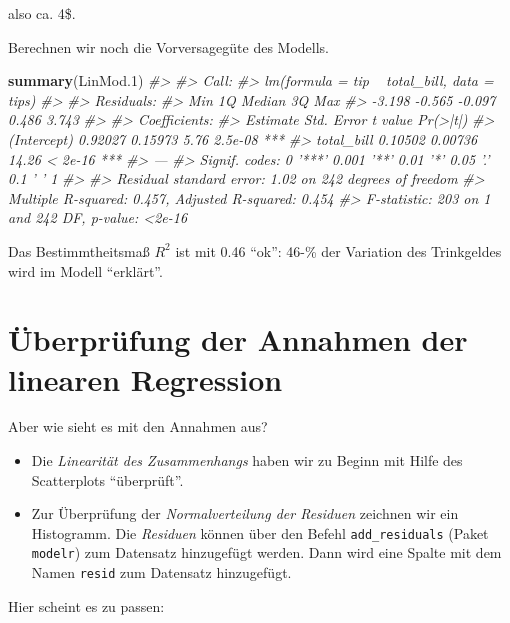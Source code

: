 \documentclass[12pt,ngerman,]{book}
\makeatletter
\newenvironment{Shaded}{\begin{snugshade}}{\end{snugshade}}
\newcommand{\KeywordTok}[1]{\textcolor[rgb]{0.13,0.29,0.53}{\textbf{{#1}}}}
\newcommand{\FloatTok}[1]{\textcolor[rgb]{0.00,0.00,0.81}{{#1}}}
\newcommand{\CommentTok}[1]{\textcolor[rgb]{0.56,0.35,0.01}{\textit{{#1}}}}
\newcommand{\NormalTok}[1]{{#1}}
\providecommand{\tightlist}{%
  \setlength{\itemsep}{0pt}\setlength{\parskip}{0pt}}
\newenvironment{kframe}{%
\medskip{}
\setlength{\fboxsep}{.8em}
 \def\at@end@of@kframe{}%
 \ifinner\ifhmode%
  \def\at@end@of@kframe{\end{minipage}}%
  \begin{minipage}{\columnwidth}%
 \fi\fi%
 \def\FrameCommand##1{\hskip\@totalleftmargin \hskip-\fboxsep
 \colorbox{shadecolor}{##1}\hskip-\fboxsep
     \hskip-\linewidth \hskip-\@totalleftmargin \hskip\columnwidth}%
 \MakeFramed {\advance\hsize-\width
   \@totalleftmargin\z@ \linewidth\hsize
   \@setminipage}}%
 {\par\unskip\endMakeFramed%
 \at@end@of@kframe}
\renewenvironment{Shaded}{\begin{kframe}}{\end{kframe}}
\makeatother
\begin{document}
also ca. 4\$.

Berechnen wir noch die Vorversagegüte des Modells.

\begin{Shaded}
\begin{Highlighting}[]
\KeywordTok{summary}\NormalTok{(LinMod}\FloatTok{.1}\NormalTok{)}
\CommentTok{#> }
\CommentTok{#> Call:}
\CommentTok{#> lm(formula = tip ~ total_bill, data = tips)}
\CommentTok{#> }
\CommentTok{#> Residuals:}
\CommentTok{#>    Min     1Q Median     3Q    Max }
\CommentTok{#> -3.198 -0.565 -0.097  0.486  3.743 }
\CommentTok{#> }
\CommentTok{#> Coefficients:}
\CommentTok{#>             Estimate Std. Error t value Pr(>|t|)    }
\CommentTok{#> (Intercept)  0.92027    0.15973    5.76  2.5e-08 ***}
\CommentTok{#> total_bill   0.10502    0.00736   14.26  < 2e-16 ***}
\CommentTok{#> ---}
\CommentTok{#> Signif. codes:  0 '***' 0.001 '**' 0.01 '*' 0.05 '.' 0.1 ' ' 1}
\CommentTok{#> }
\CommentTok{#> Residual standard error: 1.02 on 242 degrees of freedom}
\CommentTok{#> Multiple R-squared:  0.457,  Adjusted R-squared:  0.454 }
\CommentTok{#> F-statistic:  203 on 1 and 242 DF,  p-value: <2e-16}
\end{Highlighting}
\end{Shaded}

Das Bestimmtheitsmaß \(R^2\) ist mit 0.46 ``ok'': 46-\% der Variation
des Trinkgeldes wird im Modell ``erklärt''.

\section{Überprüfung der Annahmen der linearen
Regression}\label{uberprufung-der-annahmen-der-linearen-regression}

Aber wie sieht es mit den Annahmen aus?

\begin{itemize}
\tightlist
\item
  Die \emph{Linearität des Zusammenhangs} haben wir zu Beginn mit Hilfe
  des Scatterplots ``überprüft''.
\item
  Zur Überprüfung der \emph{Normalverteilung der Residuen} zeichnen wir
  ein Histogramm. Die \emph{Residuen} können über den
  Befehl \texttt{add\_residuals} (Paket \texttt{modelr}) zum Datensatz
  hinzugefügt werden. Dann wird eine Spalte mit dem Namen \texttt{resid}
  zum Datensatz hinzugefügt.
\end{itemize}

Hier scheint es zu passen:
\end{document}
